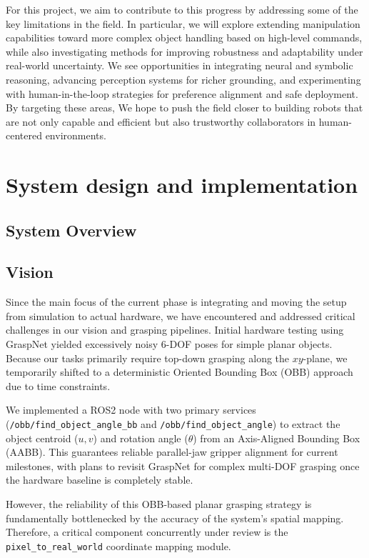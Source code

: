 \documentclass[12pt]{extarticle}
\begin{document}
For this project, we aim to contribute to this progress by addressing some of the key limitations in the field. In particular, we will explore extending manipulation capabilities toward more complex object handling based on high-level commands, while also investigating methods for improving robustness and adaptability under real-world uncertainty. We see opportunities in integrating neural and symbolic reasoning, advancing perception systems for richer grounding, and experimenting with human-in-the-loop strategies for preference alignment and safe deployment. By targeting these areas, We hope to push the field closer to building robots that are not only capable and efficient but also trustworthy collaborators in human-centered environments.

\newpage
\section{System design and implementation}

\subsection{System Overview}

\subsection{Vision}
Since the main focus of the current phase is integrating and moving the setup from simulation to actual hardware, we have encountered and addressed critical challenges in our vision and grasping pipelines. Initial hardware testing using GraspNet yielded excessively noisy 6-DOF poses for simple planar objects. Because our tasks primarily require top-down grasping along the $xy$-plane, we temporarily shifted to a deterministic Oriented Bounding Box (OBB) approach due to time constraints. 

We implemented a ROS2 node with two primary services \\(\texttt{/obb/find\_object\_angle\_bb} and \texttt{/obb/find\_object\_angle}) to extract the object centroid ($u,v$) and rotation angle ($\theta$) from an Axis-Aligned Bounding Box (AABB). This guarantees reliable parallel-jaw gripper alignment for current milestones, with plans to revisit GraspNet for complex multi-DOF grasping once the hardware baseline is completely stable.

However, the reliability of this OBB-based planar grasping strategy is fundamentally bottlenecked by the accuracy of the system's spatial mapping. Therefore, a critical component concurrently under review is the \texttt{pixel\_to\_real\_world} coordinate mapping module. 
\end{document}
